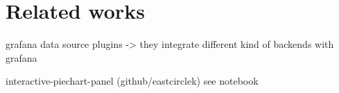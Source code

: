 \chapter{Related works}

grafana data source plugins -> they integrate different kind of backends with grafana

interactive-piechart-panel (github/eastcirclek)
see notebook
